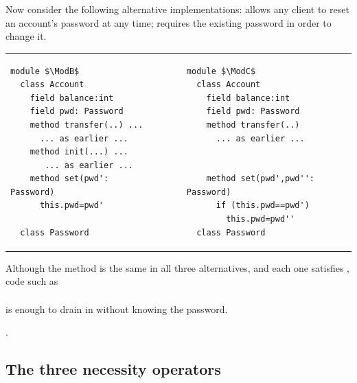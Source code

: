  
Now consider the following alternative implementations:
\ModB allows any client to reset an account's password at any time;
\ModC requires the existing password in order to change it.
  
  

\begin{tabular}{lll}
\begin{minipage}[b]{0.42\textwidth}
\begin{lstlisting}[mathescape=true, language=chainmail, frame=lines]
module $\ModB$
  class Account
    field balance:int 
    field pwd: Password 
    method transfer(..) ...
      ... as earlier ...
    method init(...) ...
       ... as earlier ...
    method set(pwd': Password)
      this.pwd=pwd'
      
  class Password
\end{lstlisting}
\end{minipage}
&\ \ \  \ \   &%
\begin{minipage}[b]{0.45\textwidth}
\begin{lstlisting}[mathescape=true, language=chainmail, frame=lines]
module $\ModC$
  class Account
    field balance:int 
    field pwd: Password 
    method transfer(..) 
      ... as earlier ...
    
    
    method set(pwd',pwd'': Password)
      if (this.pwd==pwd') 
        this.pwd=pwd''
  class Password
\end{lstlisting}
\end{minipage} 
\end{tabular}

Although the  method is the same in
all three alternatives, and each one satisfies \Sclassic,
code  {such as}
\\ 
$\ \strut \hspace{.2in} $ 
\\ 
is enough to drain   in \ModB without knowing the password.

.

\subsection{The three necessity operators}
\label{s:approach:necopers}

